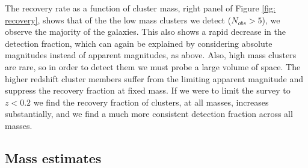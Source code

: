 \documentclass[fleqn,usenatbib]{mnras}
\newcommand{\multic}[2]{\multicolumn{#1}{c}{#2}}
\newcommand{\rottext}[2]{\multirow{#1}{*}{\rotatebox[origin=c]{90}{#2}}}
\begin{document}
The recovery rate as a function of cluster mass, right panel of Figure \ref{fig: recovery}, shows that of the the low mass clusters we detect ($N_{obs} >5$), we observe the majority of the galaxies. This also shows a rapid decrease in the detection fraction, which can again be explained by considering absolute magnitudes instead of apparent magnitudes, as above. Also, high mass clusters are rare, so in order to detect them we must probe a large volume of space. The higher redshift cluster members suffer from the limiting apparent magnitude and suppress the recovery fraction at fixed mass. If we were to limit the survey to $z<0.2$ we find the recovery fraction of clusters, at all masses, increases substantially, and we find a much more consistent detection fraction across all masses.

\subsection{Mass estimates}
\end{document}
